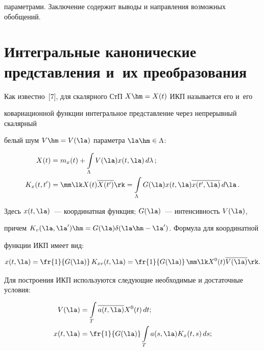 параметрами. Заключение содержит выводы и направления возможных обобщений.





\section{Интегральные канонические представления и~их преобразования}



Как известно~[7], для скалярного СтП $X\hm=X(t)$ ИКП называется его и~его 

ковариационной функции интегральное представление через непрерывный скалярный 

белый шум $V\hm=V(\la)$ параметра $\la \hm\in \Lambda$:

    \begin{align}

    X(t) &= m_x (t) + \int\limits_\Lambda V(\la) x (t,\la)\,d\lambda\,;\label{e2.1-s}\\

    K_x (t, t') &=\mm \lk X(t) \overline{X(t')}\rk = \int\limits_\Lambda G (\la) x 

(t,\la) \overline{x(t',\la)}\, d\la\,.\notag %

\end{align}

Здесь  $x(t,\la)$~--- координатная функция; $G (\la)$~--- ин\-тен\-сив\-ность $V(\la)$, 

причем $K_v (\la,\la') \hm= G(\la) \delta (\la\hm-\la')$. Формула для координатной 

функции ИКП имеет вид:

 \begin{equation*}

 x(t,\la) = \fr{1}{G(\la)}\, K_{xv} (t,\la) = \fr{1}{G(\la)}\, \mm \lk X^0 

(t) \overline{V(\la)}\rk.


\end{equation*}

Для построения ИКП используются следующие необходимые и достаточные условия:



\noindent

  \begin{align}

  V(\la) &= \int\limits_T\overline{a(t,\la)} X^0(t)\, dt;\label{e2.4-s}\\

    x(t,\la) &=  \fr{1}{G(\la)} \int\limits_T a(s,\la)K_x(t,s)\,ds;\label{e2.5-s}

    \end{align}

